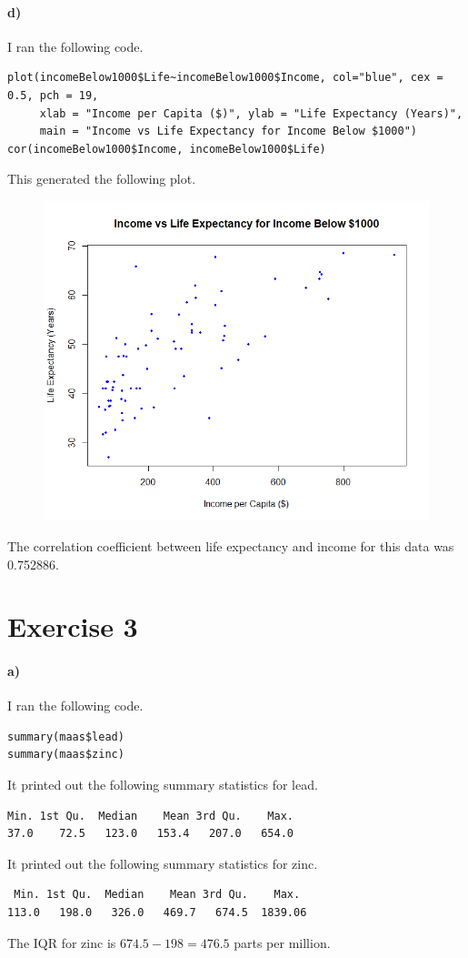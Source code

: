 \documentclass[12pt]{article}
\begin{document}
\paragraph{d)}

I ran the following code.
\scriptsize
\begin{verbatim}
plot(incomeBelow1000$Life~incomeBelow1000$Income, col="blue", cex = 0.5, pch = 19,
     xlab = "Income per Capita ($)", ylab = "Life Expectancy (Years)",
     main = "Income vs Life Expectancy for Income Below $1000")
cor(incomeBelow1000$Income, incomeBelow1000$Life)
\end{verbatim}
\normalsize
This generated the following plot.
\begin{figure}[H]
    \begin{center}
        \includegraphics[width=4.5in]{exercise2d.png}
    \end{center}
\end{figure}
The correlation coefficient between life expectancy and income for this data was 0.752886.

\section*{Exercise 3}

\paragraph{a)}

I ran the following code.
\begin{verbatim}
summary(maas$lead)
summary(maas$zinc)
\end{verbatim}
It printed out the following summary statistics for lead.
\begin{verbatim}
Min. 1st Qu.  Median    Mean 3rd Qu.    Max.
37.0    72.5   123.0   153.4   207.0   654.0
\end{verbatim}
It printed out the following summary statistics for zinc.
\begin{verbatim}
 Min. 1st Qu.  Median    Mean 3rd Qu.    Max.
113.0   198.0   326.0   469.7   674.5  1839.06
\end{verbatim}
The IQR for zinc is \(674.5-198=476.5\) parts per million.
\end{document}
